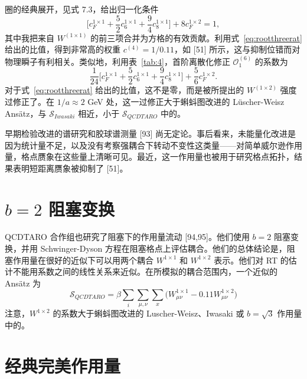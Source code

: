 圈的经典展开，见式 7.3，给出归一化条件
\begin{equation}
\bigg[c_F^{1\times1} + \frac{5}{2}c_6^{1\times1}
    + \frac{9}{4}c_8^{1\times1}\bigg] + 8c_F^{1\times2} = 1,
\end{equation}
其中我把来自 $W^{(1\times1)}$ 的前三项合并为方格的有效贡献。利用式~\ref{eq:rootthreerat} 给出的比值，得到非常高的权重 $c^{(4)} = 1/0.11$，如 [51] 所示，这与抑制位错而对物理瞬子有利相关。类似地，利用表~\ref{tab:4}，首阶离散化修正 $\mathcal{O}_1^{(6)}$ 的系数为
\begin{equation}
\frac{1}{24}\bigg[c_F^{1\times1} + \frac{5}{2}c_6^{1\times1}
    + \frac{9}{4}c_8^{1\times1}\bigg]
    + \frac{5}{6}c_F^{1\times2}.
\end{equation}
对于式~\ref{eq:rootthreerat} 给出的比值，这不是零，而是被所提出的 $W^{(1\times2)}$ 强度过修正了。在 $1/a \approx 2$ GeV 处，这一过修正大于蝌蚪图改进的 L\"uscher-Weisz Ans\"atz，与
$\mathcal{S}_{Iwasaki}$ 相近，小于 $\mathcal{S}_{QCDTARO}$ 中的。

早期检验改进的谱研究和胶球谱测量 [93] 尚无定论。事后看来，未能量化改进是因为统计量不足，以及没有考察强耦合下转动不变性这类量——对简单威尔逊作用量，格点赝象在这些量上清晰可见。最近，这一作用量也被用于研究格点拓扑，结果表明短距离赝象被抑制了 [51]。

\section{$b=2$ 阻塞变换}

QCDTARO 合作组也研究了阻塞下的作用量流动 [94,95]。他们使用 $b = 2$ 阻塞变换，并用 Schwinger-Dyson 方程在阻塞格点上评估耦合。他们的总体结论是，阻塞作用量在很好的近似下可以用两个耦合 $W^{1\times1}$ 和 $W^{1\times2}$ 表示。他们对 RT 的估计不能用系数之间的线性关系来近似。在所模拟的耦合范围内，一个近似的 Ans\"atz 为
\begin{equation}
\mathcal{S}_{QCDTARO} = \beta\sum_i\sum_{\mu,\nu}\sum_x
    \bigg(W^{1\times1}_{\mu\nu} - 0.11W^{1\times2}_{\mu\nu}\bigg)
\end{equation}
注意，$W^{1\times2}$ 的系数大于蝌蚪图改进的 Luscher-Weisz、Iwasaki 或 $b = \sqrt{3}$ 作用量中的。

\section{经典完美作用量}

